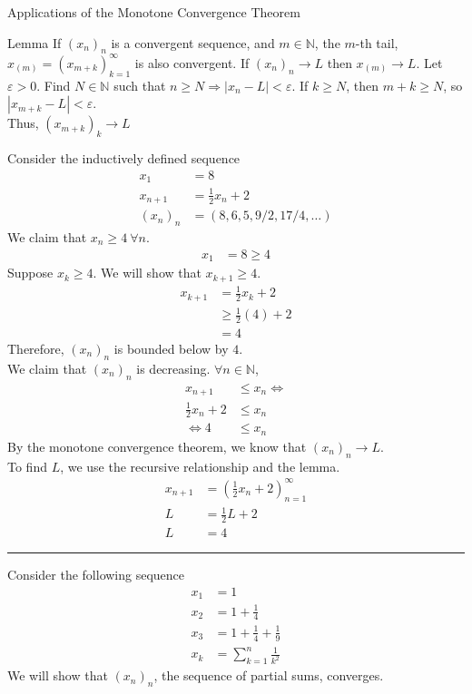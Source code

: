 \documentclass[8pt]{extarticle}
\newcommand{\N}{\mathbb{N}}
\begin{document}
  \begin{problem}{Applications of the Monotone Convergence Theorem}
    \begin{problem}{Lemma}
      If $(x_n)_n$ is a convergent sequence, and $m\in\N$, the $m$-th tail, $x_{(m)} = (x_{m+k})_{k=1}^{\infty}$ is also convergent. If $(x_n)_n \rightarrow L$ then $x_{(m)}\rightarrow L$.
      \tcblower
      Let $\varepsilon > 0$. Find $N\in\N$ such that $n\geq N \Rightarrow |x_n - L| < \varepsilon$. If $k \geq N$, then $m + k \geq N$, so $|x_{m+k}-L| < \varepsilon$.\\

      Thus, $\left(x_{m+k}\right)_k \rightarrow L$
    \end{problem}
    Consider the inductively defined sequence
    \begin{align*}
      x_{1} &= 8\\
      x_{n+1} &= \frac{1}{2}x_n + 2\\
      (x_n)_n &= (8,6,5,9/2,17/4,\dots)
    \end{align*}
    We claim that $x_n \geq 4~\forall n$.
    \begin{align*}
      x_1 &= 8 \geq 4
    \end{align*}
    Suppose $x_k \geq 4$. We will show that $x_{k+1} \geq 4$.
    \begin{align*}
      x_{k + 1} &= \frac{1}{2}x_k + 2\\
                &\geq \frac{1}{2}(4) + 2\\
                &= 4
    \end{align*}
    Therefore, $(x_n)_n$ is bounded below by $4$.\\

    We claim that $(x_n)_n$ is decreasing. $\forall n\in\N$,
    \begin{align*}
      x_{n+1} &\leq x_n
      \Leftrightarrow \\
      \frac{1}{2}x_n + 2 &\leq x_n\\
      \Leftrightarrow
      4 &\leq x_n
    \end{align*}
    By the monotone convergence theorem, we know that $(x_n)_n\rightarrow L$.\\

    To find $L$, we use the recursive relationship and the lemma.
    \begin{align*}
      x_{n+1} &= \left(\frac{1}{2}x_n + 2\right)_{n=1}^{\infty}\\
      L &= \frac{1}{2}L + 2\\
      L &= 4
    \end{align*}
    \vspace{4pt}
    \rule{\textwidth}{0.4pt}
    \vspace{4pt}
    Consider the following sequence
    \begin{align*}
      x_1 &= 1\\
      x_2 &= 1 + \frac{1}{4}\\
      x_3 &= 1 + \frac{1}{4} + \frac{1}{9}\\
      x_{k} &= \sum_{k=1}^{n} \frac{1}{k^2}
    \end{align*}
    We will show that $(x_n)_n$, the sequence of partial sums, converges.\\


\end{problem}
\end{document}

